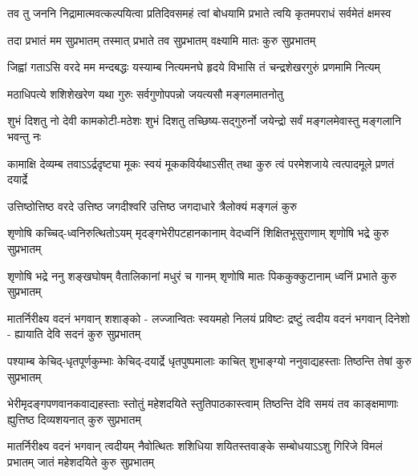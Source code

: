 

{तव तु जननि निद्रामात्मवत्कल्पयित्वा}
{प्रतिदिवसमहं त्वां बोधयामि प्रभाते}
{त्वयि कृतमपराधं सर्वमेतं क्षमस्व}

{तदा प्रभातं मम सुप्रभातम्}
{तस्मात् प्रभाते तव सुप्रभातम्}
{वक्ष्यामि मातः कुरु सुप्रभातम्}

{जिह्वां गताऽसि वरदे मम मन्दबद्धः}
{यस्याम्ब नित्यमनघे हृदये विभासि}
{तं चन्द्रशेखरगुरुं प्रणमामि नित्यम्}

{मठाधिपत्ये शशिशेखरेण}
{यथा गुरुः सर्वगुणोपपन्नो}
{जयत्यसौ मङ्गलमातनोतु}

{शुभं दिशतु नो देवी कामकोटी-मठेशः}
{शुभं दिशतु तच्छिष्य-सद्गुरुर्नो जयेन्द्रो}
{सर्वं मङ्गलमेवास्तु मङ्गलानि भवन्तु नः}

\fourlineindentedshloka
{कामाक्षि देव्यम्ब तवाऽऽर्द्रदृष्ट्या}
{मूकः स्वयं मूककविर्यथाऽसीत्}
{तथा कुरु त्वं परमेशजाये}
{त्वत्पादमूले प्रणतं दयार्द्रे}

\twolineshloka
{उत्तिष्ठोत्तिष्ठ वरदे उत्तिष्ठ जगदीश्वरि}
{उत्तिष्ठ जगदाधारे त्रैलोक्यं मङ्गलं कुरु}

\fourlineindentedshloka
{शृणोषि कच्चिद्-ध्वनिरुत्थितोऽयम्}
{मृदङ्गभेरीपटहानकानाम्}
{वेदध्वनिं शिक्षितभूसुराणाम्}
{शृणोषि भद्रे कुरु सुप्रभातम्}

\fourlineindentedshloka
{शृणोषि भद्रे ननु शङ्खघोषम्}
{वैतालिकानां मधुरं च गानम्}
{शृणोषि मातः पिककुक्कुटानाम्}
{ध्वनिं प्रभाते कुरु सुप्रभातम्}

\fourlineindentedshloka
{मातर्निरीक्ष्य वदनं भगवान् शशाङ्को -}
{लज्जान्वितः स्वयमहो निलयं प्रविष्टः}
{द्रष्टुं त्वदीय वदनं भगवान् दिनेशो -}
{ह्यायाति देवि सदनं कुरु सुप्रभातम्}

\fourlineindentedshloka
{पश्याम्ब केचिद्-धृतपूर्णकुम्भाः}
{केचिद्-दयार्द्रे धृतपुष्पमालाः}
{काचित् शुभाङ्ग्यो ननुवाद्यहस्ताः}
{तिष्ठन्ति तेषां कुरु सुप्रभातम्}

\fourlineindentedshloka
{भेरीमृदङ्गपणवानकवाद्यहस्ताः}
{स्तोतुं महेशदयिते स्तुतिपाठकास्त्वाम्}
{तिष्ठन्ति देवि समयं तव काङ्क्षमाणाः}
{ह्युत्तिष्ठ दिव्यशयनात् कुरु सुप्रभातम्}

\fourlineindentedshloka
{मातर्निरीक्ष्य वदनं भगवान् त्वदीयम्}
{नैवोत्थितः शशिधिया शयितस्तवाङ्के}
{सम्बोधयाऽऽशु गिरिजे विमलं प्रभातम्}
{जातं महेशदयिते कुरु सुप्रभातम्}

